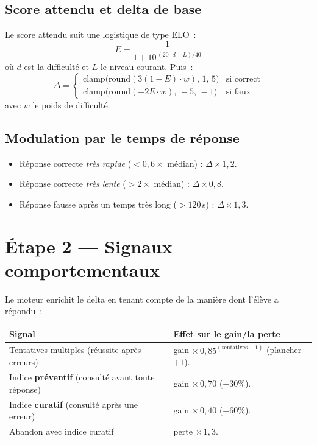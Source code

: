 \subsection{Score attendu et delta de base}
Le \og score attendu\fg{} suit une logistique de type ELO~:
\[
E = \frac{1}{1 + 10^{\,(20 \cdot d - L)/40}}
\]
où $d$ est la difficulté et $L$ le niveau courant. Puis~:
\[
\Delta =
\begin{cases}
\mathrm{clamp}\big(\mathrm{round}(3(1-E)\cdot w),\,1,\,5\big) & \text{si correct}\\[4pt]
\mathrm{clamp}\big(\mathrm{round}(-2E\cdot w),\,-5,\,-1\big) & \text{si faux}
\end{cases}
\]
avec $w$ le poids de difficulté.

\subsection{Modulation par le temps de réponse}
\begin{itemize}
  \item Réponse correcte \emph{très rapide} ($< 0{,}6 \times$ médian) : $\Delta \times 1{,}2$.
  \item Réponse correcte \emph{très lente} ($> 2 \times$ médian) : $\Delta \times 0{,}8$.
  \item Réponse fausse après un temps très long ($> 120$\,s) : $\Delta \times 1{,}3$.
\end{itemize}

\section{Étape 2 --- Signaux comportementaux}
Le moteur enrichit le delta en tenant compte de la manière dont l'élève a
répondu~:

\begin{longtable}{p{5.5cm}p{8.5cm}}
\toprule
\textbf{Signal} & \textbf{Effet sur le gain/la perte} \\
\midrule
\endhead
Tentatives multiples (réussite après erreurs) & gain $\times\,0{,}85^{(\text{tentatives}-1)}$ (plancher $+1$). \\
Indice \textbf{préventif} (consulté avant toute réponse) & gain $\times\,0{,}70$ ($-30\%$). \\
Indice \textbf{curatif} (consulté après une erreur) & gain $\times\,0{,}40$ ($-60\%$). \\
Abandon avec indice curatif & perte $\times\,1{,}3$. \\
\bottomrule
\end{longtable}

